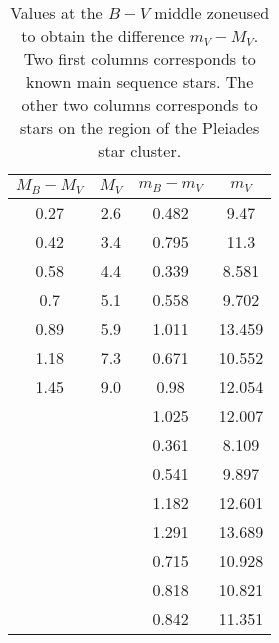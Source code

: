 \begin{table}[H]
	\centering
	\begin{tabular}{ c  c || c  c }
		\\\hline
		\centering
			$M_B-M_V$ & $M_V$ & $m_B-m_V$ & $m_V$ \\\hline
			0.27 & 2.6 & 0.482 & 9.47 \\
			0.42 & 3.4 & 0.795 & 11.3 \\
			0.58 & 4.4 & 0.339 & 8.581 \\
			0.7 & 5.1 & 0.558 & 9.702 \\
			0.89 & 5.9 & 1.011 & 13.459 \\
			1.18 & 7.3 & 0.671 & 10.552 \\
			1.45 & 9.0 & 0.98 & 12.054 \\
			  &   & 1.025 & 12.007 \\
			  &   & 0.361 & 8.109 \\
			  &   & 0.541 & 9.897 \\
			  &   & 1.182 & 12.601 \\
			  &   & 1.291 & 13.689 \\
			  &   & 0.715 & 10.928 \\
			  &   & 0.818 & 10.821 \\
			  &   & 0.842 & 11.351 \\\hline
	\end{tabular}
	\caption{\label{Tab:MiddleData}Values at the $B-V$ middle zoneused to obtain the difference $m_V-M_V$. Two first columns corresponds to known main sequence stars. The other two columns corresponds to stars on the region of the Pleiades star cluster.}
\end{table}
